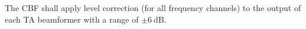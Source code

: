The CBF shall apply level correction (for all frequency channels) to the
output of each TA beamformer with a range of $\pm \SI{6}{\dB}$.
